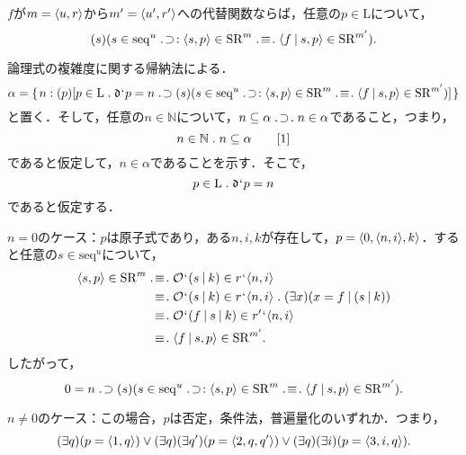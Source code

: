 \begin{thm}
\label{thm:代替モデル充足}
$f$が$ m = \langle u,r \rangle $から$ m' = \langle u',r' \rangle $への代替関数ならば，任意の$p\in\mathrm{L}$について，
\[
    (s)(s\in \mathrm{seq}^u\case{1}{1}{2}\orp{s,p}\in\mathrm{SR}^m\case{3}{1}{1}\orp{f\resl s,p}\in\mathrm{SR}^{m'}).
\]
\end{thm}
\begin{pfx}
\setcounter{equation}{0}
論理式の複雑度に関する帰納法による．
\[
    \alpha = \classab{n:
        (p)[p\in\mathrm{L}\con{1}\mathfrak{d}\fap p = n\case{1}{1}{0}
            (s)(s\in \mathrm{seq}^u\case{1}{1}{2}\orp{s,p}\in\mathrm{SR}^m\case{3}{1}{1}\orp{f\resl s,p}\in\mathrm{SR}^{m'})
        ]
    }
\]
と置く．そして，任意の$ n\in\mathbb{N} $について，$ n\subseteq \alpha\case{1}{1}{1}n\in\alpha $であること，つまり，
\begin{equation}
    n\in\mathbb{N}\con{1}n\subseteq\alpha \tag*{[1]}
\end{equation}
であると仮定して，$ n\in\alpha $であることを示す．そこで，
\begin{equation}
    p\in\mathrm{L}\con{1}\mathfrak{d}\fap p = n
\end{equation}
であると仮定する．

$n = 0$のケース：$p$は原子式であり，ある$n,i,k$が存在して，$ p = \langle 0,\langle n,i \rangle,k \rangle $．すると任意の$s\in \mathrm{seq}^u$について，
\begin{align*}
    \orp{s,p}\in \mathrm{SR}^m & \case{3}{1}{1} \mathcal{O}\fap (s \resl k)\in r\fap\orp{n,i}\\
    &\:\, \case{3}{0}{1} \mathcal{O}\fap (s \resl k)\in r\fap\orp{n,i}\con{1}(\exists x)(x = f\resl(s \resl k))\\
    &\:\, \case{3}{0}{1} \mathcal{O}\fap (f\resl s \resl k)\in r'\fap\orp{n,i}\\
    &\:\, \case{3}{0}{1} \orp{f\resl s,p}\in \mathrm{SR}^{m'}.
\end{align*}
したがって，
\begin{equation}
    0 = n\case{1}{1}{0}(s)(s\in \mathrm{seq}^u\case{1}{1}{2}\orp{s,p}\in\mathrm{SR}^m\case{3}{1}{1}\orp{f\resl s,p}\in\mathrm{SR}^{m'}).
\end{equation}

$n \neq 0$のケース：この場合，$p$は否定，条件法，普遍量化のいずれか．つまり，
\begin{equation*}
    (\exists q)(p = \orp{1,q})\case{2}{0}{0}(\exists q)(\exists q')(p = \orp{2,q,q'})\case{2}{0}{0}(\exists q)(\exists i)(p = \orp{3,i,q}).
\end{equation*}


\end{pfx}
